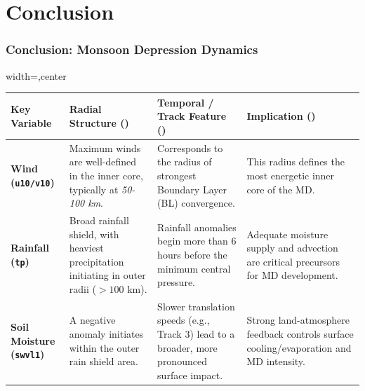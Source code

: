 \documentclass[aspectratio=169,t,xcolor=table]{beamer}
\begin{document}
\section{Conclusion}
\begin{frame}
	\frametitle{Conclusion: Monsoon Depression Dynamics}
	\vspace{-0.1cm}
	\footnotesize
	\centering
	\begin{adjustbox}{width=\textwidth,center}
		\begin{tabular}{p{2.3cm} p{4.2cm} p{4.8cm} p{4.8cm}}
			\toprule
			\rowcolor{MyBlue!20}
			\textbf{Key Variable}                                                                                                                                                          & \textbf{Radial Structure (\faIcon{chart-pie})}                                                    & \textbf{Temporal / Track Feature (\faIcon{tachometer-alt})}                                    & \textbf{Implication (\faIcon{lightbulb})}                                              \\
			\midrule
			\textbf{Wind (\texttt{u10/v10})}                                                                                                                                               & Maximum winds are well-defined in the inner core, typically at \textit{50-100 km}.                & Corresponds to the radius of strongest Boundary Layer (BL) convergence.                        & This radius defines the most energetic inner core of the MD.                           \\
			\rowcolor{MyBlue!20}
			\textbf{Rainfall (\texttt{tp})}                                                                                                                                                & Broad rainfall shield, with heaviest precipitation initiating in outer radii ($>100 \text{ km}$). & Rainfall anomalies begin more than 6 hours before the minimum central pressure.                & Adequate moisture supply and advection are critical precursors for MD development.     \\
			\textbf{Soil Moisture (\texttt{swvl1})}                                                                                                                                        & A negative anomaly initiates within the outer rain shield area.                                   & Slower translation speeds (e.g., Track 3) lead to a broader, more pronounced surface impact.   & Strong land-atmosphere feedback controls surface cooling/evaporation and MD intensity. \\

\end{tabular}
\end{adjustbox}
\end{frame}
\end{document}
